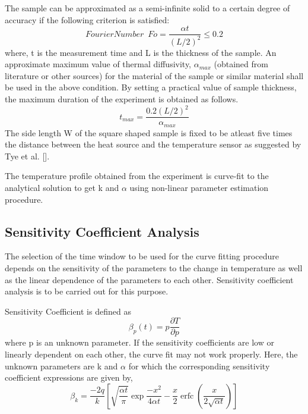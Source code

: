 \documentclass[12pt]{report}
\DeclareMathOperator{\erfc}{erfc}
\begin{document}
The sample can be approximated as a semi-infinite solid to a certain degree of accuracy if the following criterion is satisfied:
\begin{equation}
Fourier Number  \phantom{1} Fo = \frac{\alpha t }{(L/2)^{2} } \leq 0.2
\end{equation}
where, t is the measurement time and L is the thickness of
the sample. An approximate maximum value of thermal diffusivity,
$\alpha_{max}$ (obtained from literature or other sources) for the
material of the sample or similar material shall be used in the above
condition. By setting a practical value of sample thickness, the maximum
duration of the experiment is obtained as follows.
\begin{equation}
t_{max} = \frac{0.2 (L/2)^{2}}{\alpha_{max}}
\label{eq:semiinf}
\end{equation}
The side length W of the square shaped sample is fixed to be atleast five times
 the distance between the heat source and the temperature sensor as suggested
by Tye et al. {[}{]}.

The temperature profile obtained from the experiment is curve-fit to the
analytical solution to get k and $\alpha$ using non-linear parameter
estimation procedure.


\subsection*{Sensitivity Coefficient Analysis}

The selection of the time window to be used for the curve fitting
procedure depends on the sensitivity of the parameters to the change in
temperature as well as the linear dependence of the parameters to each
other. Sensitivity coefficient analysis is to be carried out for this
purpose.

 Sensitivity Coefficient is defined as
\begin{equation}
\beta_{p}(t) = p \frac{\partial T}{\partial p}
\end{equation}
where p is an unknown parameter. If the sensitivity coefficients are low
or linearly dependent on each other, the curve fit may not work
properly. Here, the unknown parameters are k and $\alpha$ for which
the corresponding sensitivity coefficient expressions are given by,
\begin{equation}
\beta_{k} =\frac{-2q}{k} \left[ \sqrt{\frac{\alpha t}{\pi}}\exp{\frac{-x^{2}}{4 \alpha t}} - \frac{x}{2}\erfc{(\frac{x}{2 \sqrt{\alpha t}})}\right]
\end{equation}
\end{document}
